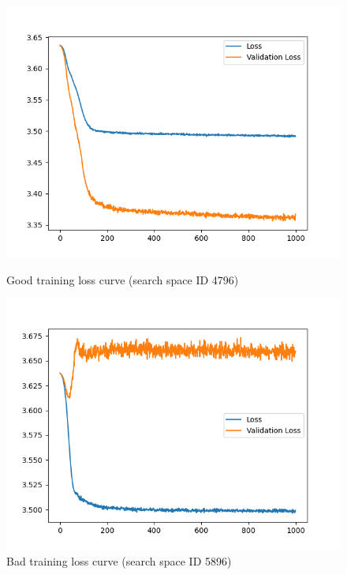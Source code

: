 \documentclass[12pt, twoside, ngerman]{report}
\begin{document}
\iffalse
\begin{figure}[h]%
\centering
\begin{minipage}{0.45\textwidth}
\includegraphics[width=\textwidth]{images/GoodLossCurve4796}
\caption{Good training loss curve (search space ID 4796)}
    \label{fig:GoodLossCurve4796}
\end{minipage}\hfill
\begin{minipage}{0.45\textwidth}
\includegraphics[width=\textwidth]{images/NegativeLearning5860}
\caption{Bad training loss curve (search space ID 5896)}
    \label{fig:NegativeLearning5860}
\end{minipage}
\end{figure}
\end{document}
